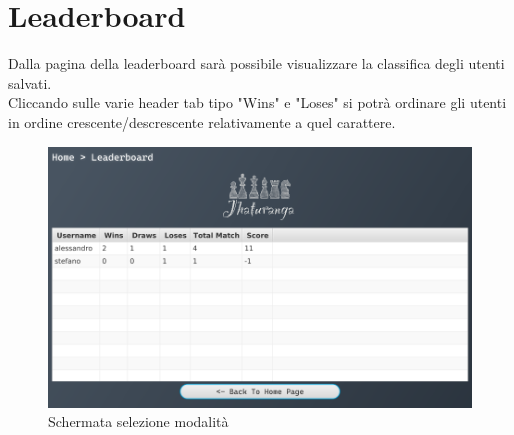\documentclass[a4paper,12pt]{report}
\begin{document}
\section{Leaderboard}
Dalla pagina della leaderboard sarà possibile visualizzare la classifica degli utenti salvati.
\\
Cliccando sulle varie header tab tipo "Wins" e "Loses" si potrà ordinare gli utenti in ordine crescente/descrescente relativamente a quel carattere. 
\begin{figure}[H]
    \begin{center}
        \centering
        \includegraphics[scale=0.4]{img/guidaUtente/leaderboard.png}
    \end{center}
    \caption{Schermata selezione modalità}
    \label{img:leaderboard}
\end{figure}
\end{document}
